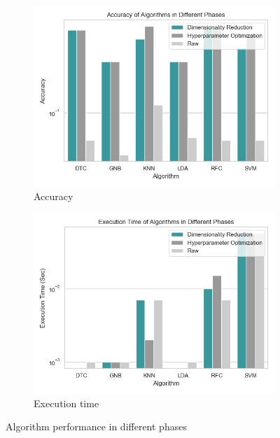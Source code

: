 \documentclass[conference,onecolumn]{IEEEtran}
\begin{document}
    \begin{figure}[H]
        \centering
        
        \begin{subfigure}{0.49\textwidth}
            \centering
            \includegraphics[width=\linewidth]{Plots/AccuracyofAlgorithmsinDifferentPhases.png}
            \caption{Accuracy}
            \label{fig:accuracyOfAlgorithmsInDifferentphases}
        \end{subfigure}
        \hfill
        \begin{subfigure}{0.49\textwidth}
            \centering
            \includegraphics[width=\linewidth]{Plots/ExecutionTimeofAlgorithmsinDifferentPhases.png}
            \caption{Execution time}
            \label{fig:executionTimeOfAlgorithmsInDifferentphases}
        \end{subfigure}
        
        \caption{Algorithm performance in different phases}
    \end{figure}
\end{document}
